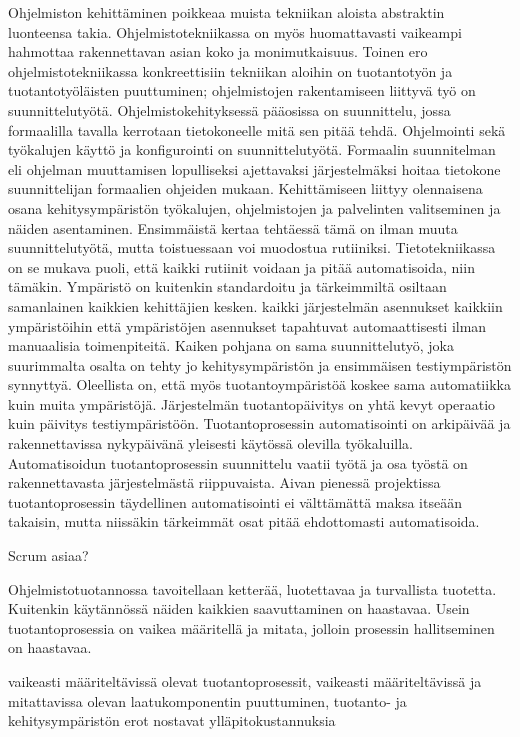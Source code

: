 \documentclass[finnish,12pt,a4paper,pdftex]{article}
\begin{document}
Ohjelmiston kehittäminen poikkeaa muista tekniikan aloista abstraktin luonteensa takia. Ohjelmistotekniikassa on myös huomattavasti vaikeampi hahmottaa rakennettavan asian koko ja monimutkaisuus. Toinen ero ohjelmistotekniikassa konkreettisiin tekniikan aloihin on tuotantotyön ja tuotantotyöläisten puuttuminen; ohjelmistojen rakentamiseen liittyvä työ on suunnittelutyötä. Ohjelmistokehityksessä pääosissa on suunnittelu, jossa formaalilla tavalla kerrotaan tietokoneelle mitä sen pitää tehdä. Ohjelmointi sekä työkalujen käyttö ja konfigurointi on suunnittelutyötä. Formaalin suunnitelman eli ohjelman muuttamisen lopulliseksi ajettavaksi järjestelmäksi hoitaa tietokone suunnittelijan formaalien ohjeiden mukaan. Kehittämiseen liittyy olennaisena osana kehitysympäristön työkalujen, ohjelmistojen ja palvelinten valitseminen ja näiden asentaminen. Ensimmäistä kertaa tehtäessä tämä on ilman muuta suunnittelutyötä, mutta toistuessaan voi muodostua rutiiniksi. Tietotekniikassa on se mukava puoli, että kaikki rutiinit voidaan ja pitää automatisoida, niin tämäkin. Ympäristö on kuitenkin standardoitu ja tärkeimmiltä osiltaan samanlainen kaikkien kehittäjien kesken. kaikki järjestelmän asennukset kaikkiin ympäristöihin että ympäristöjen asennukset tapahtuvat automaattisesti ilman manuaalisia toimenpiteitä. Kaiken pohjana on sama suunnittelutyö, joka suurimmalta osalta on tehty jo kehitysympäristön ja ensimmäisen testiympäristön synnyttyä. Oleellista on, että myös tuotantoympäristöä koskee sama automatiikka kuin muita ympäristöjä. Järjestelmän tuotantopäivitys on yhtä kevyt operaatio kuin päivitys testiympäristöön. Tuotantoprosessin automatisointi on arkipäivää ja rakennettavissa nykypäivänä yleisesti käytössä olevilla työkaluilla. Automatisoidun tuotantoprosessin suunnittelu vaatii työtä ja osa työstä on rakennettavasta järjestelmästä riippuvaista. Aivan pienessä projektissa tuotantoprosessin täydellinen automatisointi ei välttämättä maksa itseään takaisin, mutta niissäkin tärkeimmät osat pitää ehdottomasti automatisoida. \citep{kallio}

Scrum asiaa?


Ohjelmistotuotannossa tavoitellaan ketterää, luotettavaa ja turvallista tuotetta. Kuitenkin käytännössä näiden kaikkien saavuttaminen on haastavaa. Usein tuotantoprosessia on vaikea määritellä ja mitata, jolloin prosessin hallitseminen on haastavaa. 

vaikeasti määriteltävissä olevat tuotantoprosessit, vaikeasti määriteltävissä ja mitattavissa olevan laatukomponentin puuttuminen, tuotanto- ja kehitysympäristön erot nostavat ylläpitokustannuksia 
\end{document}
